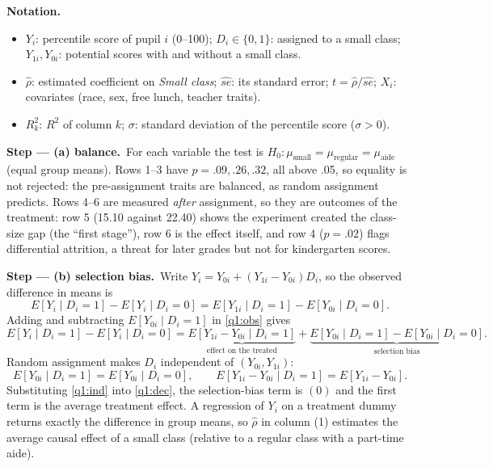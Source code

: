 \documentclass[11pt,a4paper]{article}
\newenvironment{notacao}{\par\smallskip\noindent\textbf{Notation.}\begin{itemize}[leftmargin=1.4em,topsep=1pt,itemsep=0pt]\small}{\end{itemize}}
\newcommand{\passo}[2]{\par\smallskip\noindent\textbf{Step --- #1.}~#2}
\begin{document}
\begin{sol}
\begin{notacao}
\item $Y_i$: percentile score of pupil $i$ (0--100); $D_i\in\{0,1\}$: assigned to a small class;
$Y_{1i},Y_{0i}$: potential scores with and without a small class.
\item $\hat\rho$: estimated coefficient on \emph{Small class}; $\widehat{se}$: its standard error;
$t=\hat\rho/\widehat{se}$; $X_i$: covariates (race, sex, free lunch, teacher traits).
\item $R^2_k$: $R^2$ of column $k$; $\sigma$: standard deviation of the percentile score ($\sigma>0$).
\end{notacao}

\passo{(a) balance}{For each variable the test is $H_0:\mu_{\text{small}}=\mu_{\text{regular}}=\mu_{\text{aide}}$
(equal group means). Rows 1--3 have $p=.09,.26,.32$, all above .05, so equality is not rejected: the
pre-assignment traits are balanced, as random assignment predicts. Rows 4--6 are measured \emph{after}
assignment, so they are outcomes of the treatment: row 5 (15.10 against 22.40) shows the experiment
created the class-size gap (the ``first stage''), row 6 is the effect itself, and row 4 ($p=.02$) flags
differential attrition, a threat for later grades but not for kindergarten scores.}

\passo{(b) selection bias}{Write $Y_i=Y_{0i}+(Y_{1i}-Y_{0i})D_i$, so the observed difference in means is
\begin{equation}
E[Y_i\mid D_i=1]-E[Y_i\mid D_i=0]=E[Y_{1i}\mid D_i=1]-E[Y_{0i}\mid D_i=0].\label{q1:obs}
\end{equation}
Adding and subtracting $E[Y_{0i}\mid D_i=1]$ in \eqref{q1:obs} gives
\begin{equation}
E[Y_i\mid D_i=1]-E[Y_i\mid D_i=0]=\underbrace{E[Y_{1i}-Y_{0i}\mid D_i=1]}_{\text{effect on the treated}}
+\underbrace{E[Y_{0i}\mid D_i=1]-E[Y_{0i}\mid D_i=0]}_{\text{selection bias}}.\label{q1:dec}
\end{equation}
Random assignment makes $D_i$ independent of $(Y_{0i},Y_{1i})$:
\begin{equation}
E[Y_{0i}\mid D_i=1]=E[Y_{0i}\mid D_i=0],\qquad E[Y_{1i}-Y_{0i}\mid D_i=1]=E[Y_{1i}-Y_{0i}].\label{q1:ind}
\end{equation}
Substituting \eqref{q1:ind} into \eqref{q1:dec}, the selection-bias term is $(0)$ and the first term is
the average treatment effect. A regression of $Y_i$ on a treatment dummy returns exactly the difference in
group means, so $\hat\rho$ in column (1) estimates the average causal effect of a small class (relative to
a regular class with a part-time aide).}


\end{sol}
\end{document}
